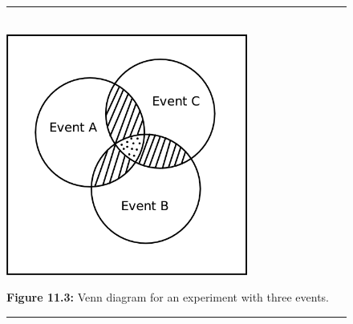 	\begin{figure}[H] %
    \begin{center}
    \rule[.1in]{\figurerulewidth}{.005in} \\
        \label{m39377*uid1222!!!underscore!!!media}\label{m39377*uid1222!!!underscore!!!printimage}\includegraphics[width=300px]{col11306.imgs/m39377_venn2.png} %
        
      \vspace{2pt}
    \vspace{\rubberspace}\par \begin{cnxcaption}
	  \small \textbf{Figure 11.3: }Venn diagram for an experiment with three events.
	\end{cnxcaption}
      
    \vspace{.1in}
    \rule[.1in]{\figurerulewidth}{.005in} \\
        
    \end{center}

 \end{figure}   

    \addtocounter{footnote}{-0}
    
